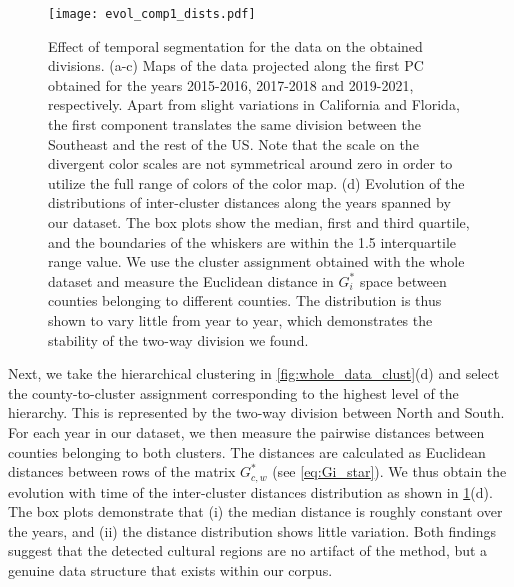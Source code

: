 \documentclass[../thesis.tex]{subfiles}
\begin{document}
\begin{figure}[ht!]
\centering
  \texttt{[image: evol\_comp1\_dists.pdf]}
  \caption{Effect of temporal segmentation for the data on the obtained divisions. (a-c)
  Maps of the data projected along the first \ac{PC} obtained for the years 2015-2016,
  2017-2018 and 2019-2021, respectively. Apart from slight variations in California and
  Florida, the first component translates the same division between the Southeast and
  the rest of the US. Note that the scale on the divergent color scales are not
  symmetrical around zero in order to utilize the full range of colors of the color map.
  (d) Evolution of the distributions of inter-cluster distances along the years spanned
  by our dataset. The box plots show the median, first and third quartile, and the
  boundaries of the whiskers are within the 1.5 interquartile range value. We use the
  cluster assignment obtained with the whole dataset and measure the Euclidean distance
  in $G_i^*$ space between counties belonging to different counties. The distribution is
  thus shown to vary little from year to year,  which demonstrates the stability of the
  two-way division we found.}
  \label{fig:evol_comp1_dists}
\end{figure}

Next, we take the hierarchical clustering in \cref{fig:whole_data_clust}(d) and select
the county-to-cluster assignment corresponding to the highest level of the hierarchy.
This is represented by the two-way division between North and South. For each year in
our dataset, we then measure the pairwise distances between counties belonging to both
clusters. The distances are calculated as Euclidean distances between rows of the matrix
$G_{c, w}^*$ (see \cref{eq:Gi_star}). We thus obtain the evolution with time of the
inter-cluster distances distribution as shown in \cref{fig:evol_comp1_dists}(d). The box
plots demonstrate that (i) the median distance is roughly constant over the years, and
(ii) the distance distribution shows little variation. Both findings suggest that the
detected cultural regions are no artifact of the method, but a genuine data structure
that exists within our corpus.
\end{document}
